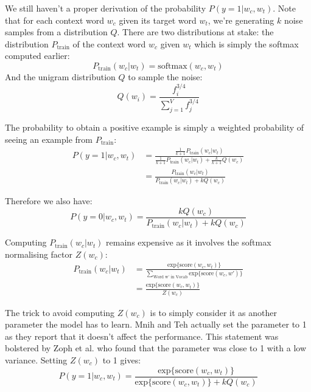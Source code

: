 We still haven't a proper derivation of the probability $P(y=1| w_c, w_t)$. Note that for each context word $w_c$ given its target word $w_t$, we're generating $k$ noise samples from a distribution $Q$. There are two distributions at stake: the distribution $P_{\text{train}}$ of the context word $w_c$ given $w_t$ which is simply the softmax computed earlier:
\begin{equation}
    P_{\text{train}}(w_c|w_t) = \text{softmax}(w_c, w_t)
\end{equation}
And the unigram distribution $Q$ to sample the noise:
\begin{equation}
    Q(w_i) = \frac{f_i^{3/4}}{\sum_{j=1}^V f_j^{3/4}}
\end{equation}

The probability to obtain a positive example is simply a weighted probability of seeing an example from $P_{\text{train}}$:
\begin{align}
    P(y=1| w_c, w_t) &= \frac{\frac{1}{k+1}P_{\text{train}}(w_c|w_t)}{\frac{1}{k+1}P_{\text{train}}(w_c|w_t) + \frac{k}{k+1}Q(w_c)}\nonumber \\
     &= \frac{P_{\text{train}}(w_c|w_t)}{P_{\text{train}}(w_c|w_t) + kQ(w_c)}
\end{align}

Therefore we also have:
\begin{equation}
    P(y=0| w_c, w_t) = \frac{kQ(w_c)}{P_{\text{train}}(w_c|w_t) + kQ(w_c)}
\end{equation}

Computing $P_{\text{train}}(w_c|w_t)$ remains expensive as it involves the softmax normalising factor $Z(w_c)$:
\begin{align}
    P_{\text{train}}(w_c|w_t) &= \frac{\text{exp}\{\text{score}(w_c, w_t)\}}{\sum_{\text{Word w' in Vocab}}\text{exp}\{\text{score}(w_c, w')\}} \nonumber \\
     &= \frac{\text{exp}\{\text{score}(w_c, w_t)\}}{Z(w_c)}
\end{align}

The trick to avoid computing $Z(w_c)$ is to simply consider it as another parameter the model has to learn. Mnih and Teh \cite{nce} actually set the parameter to 1 as they report that it doesn't affect the performance. This statement was bolstered by Zoph et al. \cite{nce2} who found that the parameter was close to 1 with a low variance. Setting $Z(w_c)$ to 1 gives:
\begin{equation}
    P(y=1| w_c, w_t) = \frac{\text{exp}\{\text{score}(w_c, w_t)\}}{\text{exp}\{\text{score}(w_c, w_t)\} + kQ(w_c)}
\end{equation}

